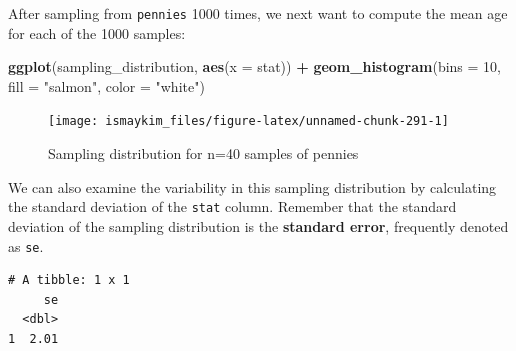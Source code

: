 \documentclass[12pt, krantz2,]{krantz}
\makeatletter
\newenvironment{Shaded}{\begin{snugshade}}{\end{snugshade}}
\newcommand{\DataTypeTok}[1]{\textcolor[rgb]{0.27,0.27,0.27}{#1}}
\newcommand{\DecValTok}[1]{\textcolor[rgb]{0.06,0.06,0.06}{#1}}
\newcommand{\KeywordTok}[1]{\textcolor[rgb]{0.27,0.27,0.27}{\textbf{#1}}}
\newcommand{\NormalTok}[1]{#1}
\newcommand{\OperatorTok}[1]{\textcolor[rgb]{0.43,0.43,0.43}{\textbf{#1}}}
\newcommand{\StringTok}[1]{\textcolor[rgb]{0.5,0.5,0.5}{#1}}
\newenvironment{kframe}{%
\medskip{}
\setlength{\fboxsep}{.8em}
 \def\at@end@of@kframe{}%
 \ifinner\ifhmode%
  \def\at@end@of@kframe{\end{minipage}}%
  \begin{minipage}{\columnwidth}%
 \fi\fi%
 \def\FrameCommand##1{\hskip\@totalleftmargin \hskip-\fboxsep
 \colorbox{shadecolor}{##1}\hskip-\fboxsep
     \hskip-\linewidth \hskip-\@totalleftmargin \hskip\columnwidth}%
 \MakeFramed {\advance\hsize-\width
   \@totalleftmargin\z@ \linewidth\hsize
   \@setminipage}}%
 {\par\unskip\endMakeFramed%
 \at@end@of@kframe}
\renewenvironment{Shaded}{\begin{kframe}}{\end{kframe}}
\makeatother
\begin{document}
After sampling from \texttt{pennies} 1000 times, we next want to compute the mean age for each of the 1000 samples:

\begin{Shaded}
\end{Shaded}

\begin{Shaded}
\begin{Highlighting}[]
\KeywordTok{ggplot}\NormalTok{(sampling_distribution, }\KeywordTok{aes}\NormalTok{(}\DataTypeTok{x =}\NormalTok{ stat)) }\OperatorTok{+}
\StringTok{  }\KeywordTok{geom_histogram}\NormalTok{(}\DataTypeTok{bins =} \DecValTok{10}\NormalTok{, }\DataTypeTok{fill =} \StringTok{"salmon"}\NormalTok{, }\DataTypeTok{color =} \StringTok{"white"}\NormalTok{)}
\end{Highlighting}
\end{Shaded}

\begin{figure}

{\centering \texttt{[image: ismaykim\_files/figure-latex/unnamed-chunk-291-1]} 

}

\caption{Sampling distribution for n=40 samples of pennies}\label{fig:unnamed-chunk-291}
\end{figure}

We can also examine the variability in this sampling distribution by calculating the standard deviation of the \texttt{stat} column. Remember that the standard deviation of the sampling distribution is the \textbf{standard error}, frequently denoted as \texttt{se}.

\begin{Shaded}
\end{Shaded}

\begin{verbatim}
# A tibble: 1 x 1
     se
  <dbl>
1  2.01
\end{verbatim}
\end{document}
